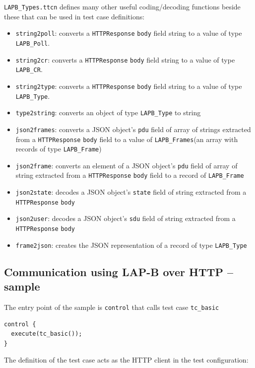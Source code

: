 \documentclass[a4paper]{article}
\begin{document}
\verb!LAPB_Types.ttcn! defines many other useful coding/decoding functions beside these that can be used in test
case definitions:
\begin{itemize}
    \item \verb!string2poll!: converts a \verb!HTTPResponse! \verb!body! field string
          to a value of type \verb!LAPB_Poll!.
    \item \verb!string2cr!: converts a \verb!HTTPResponse! \verb!body! field string
          to a
          value of type \verb!LAPB_CR!.
    \item \verb!string2type!: converts a \verb!HTTPResponse! \verb!body! field string
          to a
          value of type \verb!LAPB_Type!.
    \item \verb!type2string!: converts an object of type \verb!LAPB_Type! to string
    \item \verb!json2frames!: converts a JSON object's \verb!pdu! field  of array of strings
          extracted from a \verb!HTTPResponse! \verb!body! field to a value of
          \verb!LAPB_Frames!(an array with records of type \verb!LAPB_Frame!)
    \item \verb!json2frame!: converts an element of a JSON object's \verb!pdu! field of array
          of string extracted from a \verb!HTTPResponse! \verb!body! field to a record of
          \verb!LAPB_Frame!
    \item \verb!json2state!: decodes a JSON object's \verb!state! field of string extracted from
          a \verb!HTTPResponse! \verb!body!
    \item \verb!json2user!: decodes a JSON object's \verb!sdu! field of string extracted from
          a \verb!HTTPResponse! \verb!body!
    \item \verb!frame2json!: creates the JSON representation of a record of type \verb!LAPB_Type!
\end{itemize}

\subsection{Communication using LAP-B over HTTP -- sample}

The entry point of the sample is \verb!control! that calls test case \verb!tc_basic!

{\footnotesize
\begin{lstlisting}
control {
  execute(tc_basic());
}
\end{lstlisting}
}

The definition of the test case acts as the HTTP client in the test configuration:
\end{document}
